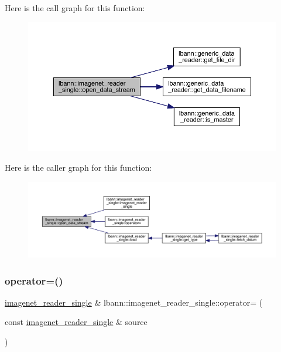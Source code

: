 Here is the call graph for this function\+:\nopagebreak
\begin{figure}[H]
\begin{center}
\leavevmode
\includegraphics[width=350pt]{classlbann_1_1imagenet__reader__single_a8db14d15bfc2de92ffb3c20f1a38dd00_cgraph}
\end{center}
\end{figure}
Here is the caller graph for this function\+:\nopagebreak
\begin{figure}[H]
\begin{center}
\leavevmode
\includegraphics[width=350pt]{classlbann_1_1imagenet__reader__single_a8db14d15bfc2de92ffb3c20f1a38dd00_icgraph}
\end{center}
\end{figure}
\mbox{\label{classlbann_1_1imagenet__reader__single_af38327f44f1de2dd191cd2d1dc193900}} 
\subsubsection{\texorpdfstring{operator=()}{operator=()}}
{\footnotesize\ttfamily \hyperlink{classlbann_1_1imagenet__reader__single}{imagenet\+\_\+reader\+\_\+single} \& lbann\+::imagenet\+\_\+reader\+\_\+single\+::operator= (\begin{DoxyParamCaption}\item[{const \hyperlink{classlbann_1_1imagenet__reader__single}{imagenet\+\_\+reader\+\_\+single} \&}]{source }\end{DoxyParamCaption})}




